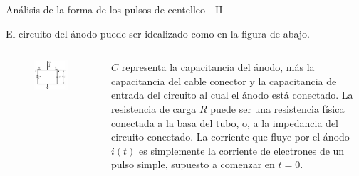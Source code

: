 \documentclass[a4paper,10pt]{beamer}
\begin{document}
\begin{frame}{Análisis de la forma de los pulsos de centelleo - II}
 
 El circuito del ánodo puede ser idealizado como en la figura de abajo.
 
 \begin{columns}[c]

\column{2in}
 \begin{figure}
  \center 
  \includegraphics[scale=0.5]{fig44}
 \end{figure}
 
 \column{2in}
 
 \begin{justify}
  $C$ representa la capacitancia del ánodo, más la capacitancia del cable conector 
  y la capacitancia de entrada del circuito al cual el ánodo está conectado. La 
  resistencia de carga $R$ puede ser una resistencia física conectada a 
  la basa del tubo, o, a la impedancia del circuito conectado. La corriente que 
  fluye por el ánodo $i(t)$ es simplemente la corriente de electrones de un pulso 
  simple, supuesto a comenzar en $t=0$.
 \end{justify}
 \end{columns}
\end{frame}
\end{document}
